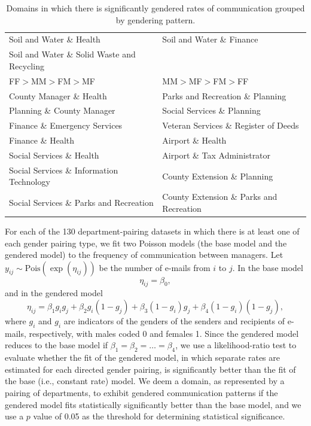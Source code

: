 \documentclass{pnastwo}
\begin{document}
\begin{article}
\begin{table}[H]
\begin{tabular}{l|l}
  Soil and Water \& Health & Soil and Water \& Finance \\ 
  Soil and Water \& Solid Waste and Recycling &  \\ 
  \hline
  FF$>$MM$>$FM$>$MF & MM$>$MF$>$FM$>$FF \\ 
  \hline
  County Manager \& Health & Parks and Recreation \& Planning \\ 
  Planning \& County Manager & Social Services \& Planning \\ 
  Finance \& Emergency Services & Veteran Services \& Register of Deeds \\ 
  Finance \& Health & Airport \& Health \\ 
  Social Services \& Health & Airport \& Tax Administrator \\ 
  Social Services \& Information Technology & County Extension \& Planning \\ 
  Social Services \& Parks and Recreation & County Extension \& Parks and Recreation \\ 
   \bottomrule
\end{tabular}
  \caption{\label{tab:significant domain table} Domains in which there is significantly gendered rates of communication grouped by gendering pattern.}
\end{table}

 
For each of the 130 department-pairing datasets in which there is at least one of each gender pairing type, we fit two Poisson models (the base model and the gendered model) to the frequency of communication between managers. Let $y_{ij}\sim \text{Pois}(\exp(\eta_{ij}))$ be the number of e-mails from $i$ to $j$. In the base model $$ \eta_{ij} = \beta_0,$$ and in the gendered model $$ \eta_{ij} =  \beta_{1}g_ig_j + \beta_{2}g_i(1-g_j)+\beta_{3}(1-g_i)g_j+\beta_{4}(1-g_i)(1-g_j),$$ where $g_i$ and $g_i$ are indicators of the genders of the senders and recipients of e-mails, respectively, with males coded 0 and females 1. Since the gendered model reduces to the base model if $\beta_1 = \beta_2 = \hdots = \beta_4$, we use a likelihood-ratio test to evaluate whether the fit of the gendered model, in which separate rates are estimated for each directed gender pairing, is significantly better than the fit of the base (i.e., constant rate) model. We deem a domain, as represented by a pairing of departments, to exhibit gendered communication patterns if the gendered model fits statistically significantly better than the base model, and we use a $p$ value of 0.05 as the threshold for determining statistical significance. 


\end{article}
\end{document}
